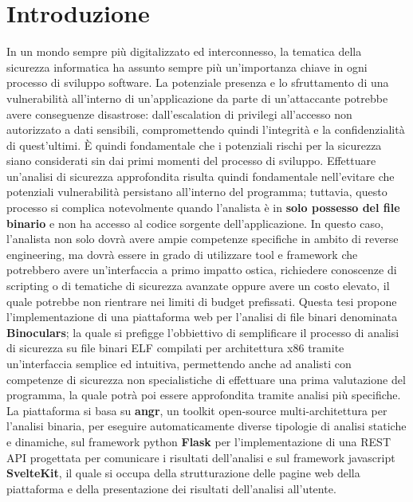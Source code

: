 \documentclass[../main.tex]{subfiles}
\begin{document}
\chapter{Introduzione}
\label{chap:intro}
In un mondo sempre più digitalizzato ed interconnesso, la tematica della sicurezza informatica ha assunto sempre più un'importanza chiave in ogni processo di sviluppo software. 
La potenziale presenza e lo sfruttamento di una vulnerabilità all'interno di un'applicazione da parte di un'attaccante potrebbe avere conseguenze disastrose: dall'escalation di privilegi
all'accesso non autorizzato a dati sensibili, compromettendo quindi l'integrità e la confidenzialità di quest'ultimi.
È quindi fondamentale che i potenziali rischi per la sicurezza siano considerati sin dai primi momenti del processo di sviluppo.
Effettuare un'analisi di sicurezza approfondita risulta quindi fondamentale nell'evitare che potenziali vulnerabilità persistano all'interno del programma; tuttavia, questo processo
si complica notevolmente quando l'analista è in \textbf{solo possesso del file binario} e non ha accesso al codice sorgente dell'applicazione.
In questo caso, l'analista non solo dovrà avere ampie competenze specifiche in ambito di reverse engineering, ma dovrà essere in grado di utilizzare tool e framework che potrebbero avere
un'interfaccia a primo impatto ostica, richiedere conoscenze di scripting o di tematiche di sicurezza avanzate oppure avere un costo elevato, il quale potrebbe non rientrare nei limiti
di budget prefissati. 
Questa tesi propone l'implementazione di una piattaforma web per l'analisi di file binari denominata \textbf{Binoculars}; la quale si prefigge l'obbiettivo di
semplificare il processo di analisi di sicurezza su file binari ELF compilati per architettura x86 tramite un'interfaccia semplice ed intuitiva, permettendo anche ad analisti con competenze di sicurezza non specialistiche di 
effettuare una prima valutazione del programma, la quale potrà poi essere approfondita tramite analisi più specifiche.
La piattaforma si basa su \textbf{angr}, un toolkit open-source multi-architettura per l'analisi binaria, per eseguire automaticamente diverse tipologie di analisi statiche e dinamiche, sul framework python \textbf{Flask} per l'implementazione di una REST API progettata per 
comunicare i risultati dell'analisi e sul framework javascript \textbf{SvelteKit}, il quale si occupa della strutturazione delle pagine web della piattaforma e della presentazione dei risultati dell'analisi all'utente.
\end{document}
